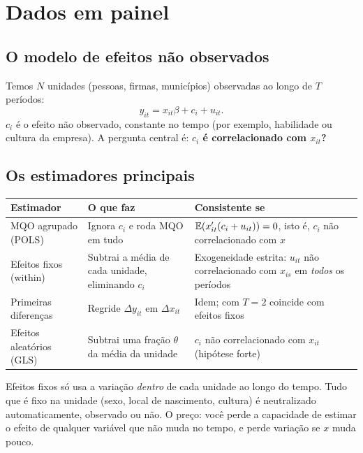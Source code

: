 \chapter{Dados em painel}
\label{cap:painel}

\section{O modelo de efeitos não observados}
Temos $N$ unidades (pessoas, firmas, municípios) observadas ao longo de $T$ períodos:
\[
y_{it}=x_{it}\beta+c_i+u_{it}.
\]
$c_i$ é o efeito não observado, constante no tempo (por exemplo, habilidade ou cultura da empresa). A pergunta central é: \textbf{$c_i$ é correlacionado com $x_{it}$?}

\section{Os estimadores principais}
\begin{center}
\small
\begin{tabular}{p{3.4cm}p{5.3cm}p{5.2cm}}
\toprule
\textbf{Estimador} & \textbf{O que faz} & \textbf{Consistente se} \\
\midrule
MQO agrupado (POLS) & Ignora $c_i$ e roda MQO em tudo & $\mathbb{E}(x_{it}'(c_i+u_{it}))=0$, isto é, $c_i$ não correlacionado com $x$ \\
Efeitos fixos (within) & Subtrai a média de cada unidade, eliminando $c_i$ & Exogeneidade estrita: $u_{it}$ não correlacionado com $x_{is}$ em \emph{todos} os períodos \\
Primeiras diferenças & Regride $\Delta y_{it}$ em $\Delta x_{it}$ & Idem; com $T=2$ coincide com efeitos fixos \\
Efeitos aleatórios (GLS) & Subtrai uma fração $\theta$ da média da unidade & $c_i$ não correlacionado com $x_{it}$ (hipótese forte) \\
\bottomrule
\end{tabular}
\end{center}

\begin{intuicao}
Efeitos fixos só usa a variação \emph{dentro} de cada unidade ao longo do tempo. Tudo que é fixo na unidade (sexo, local de nascimento, cultura) é neutralizado automaticamente, observado ou não. O preço: você perde a capacidade de estimar o efeito de qualquer variável que não muda no tempo, e perde variação se $x$ muda pouco.
\end{intuicao}

